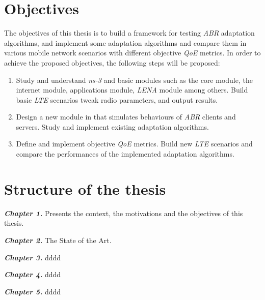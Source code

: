 \section{Objectives}
\label{sec:objectives}
The objectives of this thesis is to build a framework for testing \textit{ABR} adaptation
algorithms, and implement some adaptation algorithms and compare them in 
various mobile network scenarios with different objective \textit{QoE} metrics. 
In order to achieve the proposed objectives, the following steps will be proposed:

\begin{enumerate}
  \item Study and understand \textit{ns-3} and basic modules such as the core module, the
  internet module, applications module, \textit{LENA} module among others. Build basic \textit{LTE} scenarios
  tweak radio parameters, and output results.
  \item Design a new module in  that simulates behaviours of \textit{ABR} clients
  and servers. Study and implement existing adaptation algorithms.
  \item Define and implement objective \textit{QoE} metrics.
  Build new \textit{LTE} scenarios and compare the performances of the implemented adaptation
  algorithms.
\end{enumerate}


\section{Structure of the thesis}
\label{sec:structure}


\textbf{\textit{Chapter 1.}} Presents the context, the motivations and the objectives of this thesis.

\textbf{\textit{Chapter 2.}} The State of the Art.

\textbf{\textit{Chapter 3.}} dddd

\textbf{\textit{Chapter 4.}} dddd

\textbf{\textit{Chapter 5.}} dddd
